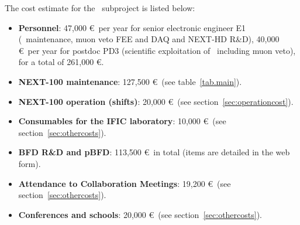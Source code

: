 The cost estimate for the \sIFIC\ subproject is listed below:
\begin{itemize}[noitemsep,topsep=0pt,parsep=0pt,partopsep=0pt]
    \item {\bf Personnel}: 47,000 \euro\ per year for senior electronic engineer E1 (\Next\ maintenance, muon veto FEE and DAQ and NEXT-HD R\&D), 40,000 \euro\ per year for postdoc PD3 (scientific exploitation of \Next\ including muon veto), for a total of 261,000 \euro.
    \item {\bf NEXT-100 maintenance}: 127,500 \euro\ (see table~\ref{tab.main}).
    \item {\bf NEXT-100 operation (shifts)}: 20,000 \euro\ (see section~\ref{sec:operationcost}).
    \item {\bf Consumables for the IFIC laboratory}: 10,000 \euro\ (see section~\ref{sec:othercosts}).
    \item {\bf BFD R\&D and pBFD}: 113,500 \euro\ in total (items are detailed in the web form). 
    \item {\bf Attendance to Collaboration Meetings}: 19,200 \euro\ (see section~\ref{sec:othercosts}).
    \item {\bf Conferences and schools}: 20,000 \euro\ (see section~\ref{sec:othercosts}).
\end{itemize}

